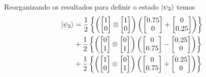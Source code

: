 Reorganizando os resultados para definir o estado $\ket{\psi_2}$ temos
\begin{equation}
 \begin{split}
   \ket{\psi_2} &=\frac{1}{2} \left\{ \left(\begin{bmatrix} 1 \\ 0 \end{bmatrix} \otimes
                  \begin{bmatrix} 1 \\ 0 \end{bmatrix}\right) \left( \begin{bmatrix} \num{0.75} \\ 0 \end{bmatrix} +
                  \begin{bmatrix} 0 \\ \num{0.25} \end{bmatrix}\right)\right\} \\
                &+\frac{1}{2} \left\{ \left(\begin{bmatrix} 0 \\ 1 \end{bmatrix} \otimes
                  \begin{bmatrix} 0 \\ 1 \end{bmatrix}\right) \left( \begin{bmatrix} 0 \\ \num{0.75} \end{bmatrix} -
                  \begin{bmatrix} \num{0.25} \\ 0 \end{bmatrix}\right)\right\} \\
                &+\frac{1}{2} \left\{\left( \begin{bmatrix} 1 \\ 0 \end{bmatrix} \otimes
                  \begin{bmatrix} 0 \\ 1 \end{bmatrix}\right) \left( \begin{bmatrix} 0 \\ \num{0.75} \end{bmatrix} +
                  \begin{bmatrix} \num{0.25} \\ 0 \end{bmatrix}\right)\right\} \\

\end{split}
\end{equation}
